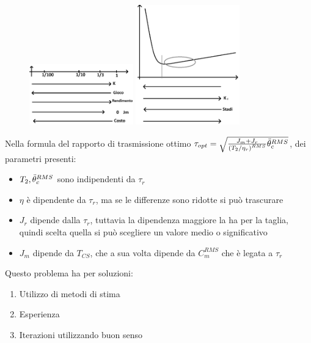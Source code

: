 \begin{figure}[h]
    \centering
    \includegraphics[width=0.4\textwidth]{Immagini/numero_std_rid_tau_opt.png}
    \includegraphics[width=0.4\textwidth]{Immagini/riepilogo_tau_opt.png}
\end{figure}

Nella formula del rapporto di trasmissione ottimo  \(\tau_{opt} = \sqrt{\frac{J_m + J_r}{\left(T_2/\eta_r\right)^{RMS}}\Ddot{\theta}_c^{RMS}}\), dei parametri presenti:
\begin{itemize}
    \item \(T_2, \Ddot{\theta}_c^{RMS}\) sono indipendenti da \(\tau_r\)
    \item \(\eta\) è dipendente da \(\tau_r\), ma se le differenze sono ridotte si può trascurare
    \item \(J_r\) dipende dalla \(\tau_r\), tuttavia la dipendenza maggiore la ha per la taglia, quindi scelta quella si può scegliere un valore medio o significativo
    \item \(J_m\) dipende da \(T_{CS}\), che a sua volta dipende da \(C_m^{RMS}\) che è legata a \(\tau_r\)
\end{itemize}

Questo problema ha per soluzioni:
\begin{enumerate}[label=\Roman*]
    \item Utilizzo di metodi di stima
    \item Esperienza
    \item Iterazioni utilizzando buon senso
\end{enumerate}

